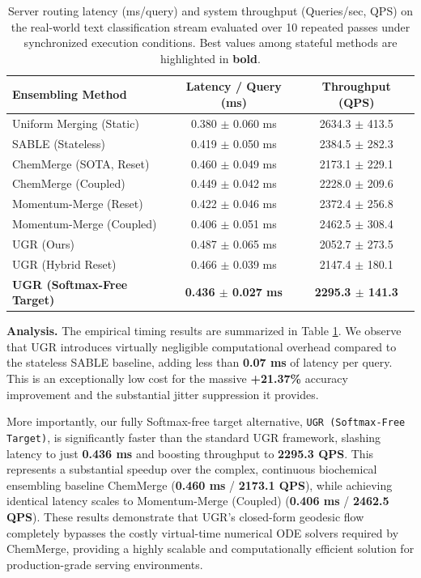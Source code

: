 \begin{table}[t]
\caption{Server routing latency (ms/query) and system throughput (Queries/sec, QPS) on the real-world text classification stream evaluated over 10 repeated passes under synchronized execution conditions. Best values among stateful methods are highlighted in \textbf{bold}.}
\label{tab:latency_results}
\vskip 0.15in
\begin{center}
\begin{small}
\begin{sc}
\setlength{\tabcolsep}{12pt}
\begin{tabular}{lcc}
\toprule
Ensembling Method & Latency / Query (ms) & Throughput (QPS) \\
\midrule
Uniform Merging (Static) & 0.380 $\pm$ 0.060 ms & 2634.3 $\pm$ 413.5 \\
SABLE (Stateless) & 0.419 $\pm$ 0.050 ms & 2384.5 $\pm$ 282.3 \\
\midrule
ChemMerge (SOTA, Reset) & 0.460 $\pm$ 0.049 ms & 2173.1 $\pm$ 229.1 \\
ChemMerge (Coupled) & 0.449 $\pm$ 0.042 ms & 2228.0 $\pm$ 209.6 \\
Momentum-Merge (Reset) & 0.422 $\pm$ 0.046 ms & 2372.4 $\pm$ 256.8 \\
Momentum-Merge (Coupled) & 0.406 $\pm$ 0.051 ms & 2462.5 $\pm$ 308.4 \\
\midrule
UGR (Ours) & 0.487 $\pm$ 0.065 ms & 2052.7 $\pm$ 273.5 \\
UGR (Hybrid Reset) & 0.466 $\pm$ 0.039 ms & 2147.4 $\pm$ 180.1 \\
\textbf{UGR (Softmax-Free Target)} & \textbf{0.436 $\pm$ 0.027 ms} & \textbf{2295.3 $\pm$ 141.3} \\
\bottomrule
\end{tabular}
\end{sc}
\end{small}
\end{center}
\vskip -0.1in
\end{table}

\textbf{Analysis.} The empirical timing results are summarized in Table \ref{tab:latency_results}. We observe that UGR introduces virtually negligible computational overhead compared to the stateless SABLE baseline, adding less than \textbf{0.07 ms} of latency per query. This is an exceptionally low cost for the massive \textbf{+21.37\%} accuracy improvement and the substantial jitter suppression it provides.

More importantly, our fully Softmax-free target alternative, \texttt{UGR (Softmax-Free Target)}, is significantly faster than the standard UGR framework, slashing latency to just \textbf{0.436 ms} and boosting throughput to \textbf{2295.3 QPS}. This represents a substantial speedup over the complex, continuous biochemical ensembling baseline ChemMerge (\textbf{0.460 ms} / \textbf{2173.1 QPS}), while achieving identical latency scales to Momentum-Merge (Coupled) (\textbf{0.406 ms} / \textbf{2462.5 QPS}). These results demonstrate that UGR's closed-form geodesic flow completely bypasses the costly virtual-time numerical ODE solvers required by ChemMerge, providing a highly scalable and computationally efficient solution for production-grade serving environments.

